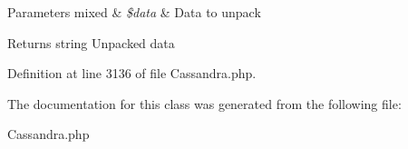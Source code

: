 \begin{DoxyParams}[1]{Parameters}
mixed & {\em \$data} & Data to unpack \\
\hline
\end{DoxyParams}
\begin{DoxyReturn}{Returns}
string Unpacked data 
\end{DoxyReturn}


Definition at line 3136 of file Cassandra.php.




The documentation for this class was generated from the following file:\begin{DoxyCompactItemize}
\item 
Cassandra.php\end{DoxyCompactItemize}
